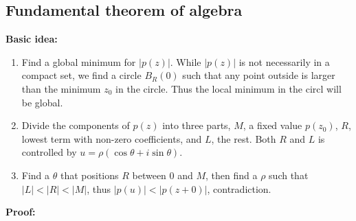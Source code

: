 \documentclass{article}
\begin{document}
\subsection{Fundamental theorem of algebra}
\textbf{Basic idea:}
\begin{enumerate}
    \item Find a global minimum for $|p(z)|$. While $|p(z)|$ is not necessarily in a compact set, we find a circle $B_R(0)$ such that any point outside is larger than the minimum $z_0$ in the circle. Thus the local minimum in the circl will be global.
    \item Divide the components of $p(z)$ into three parts, $M$, a fixed value $p(z_0)$, $R$, lowest term with non-zero coefficients, and $L$, the rest. Both $R$ and $L$ is controlled by $u = \rho(\cos\theta+i\sin\theta)$.
    \item Find a $\theta$ that positions $R$ between $0$ and $M$, then find a $\rho$ such that $|L| < |R| < |M|$, thus $|p(u)| < |p(z+0)|$, contradiction.
\end{enumerate}
\textbf{Proof:}
\end{document}
